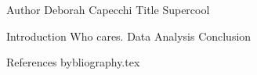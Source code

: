 Author 	Deborah Capecchi
Title	Supercool


Introduction Who cares.
Data
Analysis
Conclusion

References
bybliography.tex
